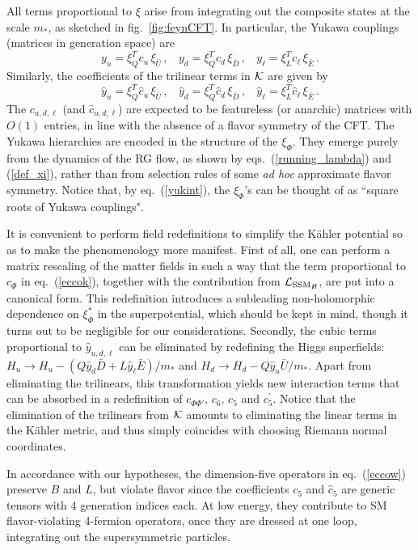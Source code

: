 \documentclass[a4paper,12pt]{article}
\newcommand{\beq}{\begin{equation}}
\newcommand{\eeq}{\end{equation}}
\def\eq#1{eq.~(\ref{#1})}
\def\fig#1{fig.~\ref{#1}}
\def\eq#1{eq.~(\ref{#1})}
\def\fig#1{fig.~\ref{#1}}
\def\mst{m_*}
\def\SSMnH{{\rm SSM}_{H \!\!\!\!\!\not\,\,\,\,\,}}
\begin{document}
All terms proportional to $\xi$ arise from integrating out the composite states at the scale $\mst$, as sketched in \fig{fig:feynCFT}. In particular, the Yukawa couplings (matrices in generation space) are
\beq
y_u =  \xi_{Q}^T c_u\, \xi_{{\bar U}}\, , ~~~~y_d = \xi_{Q}^T c_d \, \xi_{{\bar D}}\, , ~~~~y_\ell =  \xi_{L}^T c_\ell \, \xi_{{\bar E}}\, .
\label{yukint}
\eeq
Similarly, the coefficients of the trilinear terms in ${\cal K}$ are given by 
\beq
\hat y_u =  \xi_{Q}^T \hat c_u\, \xi_{{\bar U}}\, , ~~~~\hat y_d = \xi_{Q}^T \hat c_d \, \xi_{{\bar D}}\, , ~~~~\hat y_\ell =  \xi_{L}^T \hat c_\ell \, \xi_{{\bar E}}\, .
\eeq
 The $c_{u,d,\ell}$ (and $\hat c_{u,d,\ell}$) are expected to be featureless (or anarchic) matrices with $O(1)$ entries,  in line with the  absence of a flavor symmetry of  the CFT.  The Yukawa hierarchies are  encoded in the structure of the $\xi_\Phi$. They emerge purely from the dynamics of the RG flow, as shown by eqs.~(\ref{running_lambda}) and (\ref{def_xi}), rather than from selection rules of some {\emph{ad hoc}} approximate flavor symmetry. Notice that, by   \eq{yukint},  the $\xi_\Phi$'s can be thought of as ``square roots of Yukawa couplings".

It is convenient to perform field redefinitions to simplify the K\"ahler potential  so as to make the phenomenology more
manifest. First of all, one can perform a matrix rescaling of the matter fields in such a way that the term proportional to $c_\Phi$ in \eq{eccok}, together with the contribution from ${\cal L}_{\SSMnH}$, are put into a canonical form. This redefinition introduces a subleading non-holomorphic dependence on $\xi_\Phi^*$ in the superpotential, which should be kept in mind, though it turns out to be negligible for our considerations.
Secondly, the cubic terms proportional to $\hat y_{u,d,\ell}$ can be eliminated by redefining the Higgs superfields:
$H_u\to H_u-( Q \hat y_d \bar D+ L\hat y_\ell \bar E)/\mst$ and $H_d\to H_d- Q \hat y_u \bar U/\mst$. Apart from eliminating 
the trilinears, this transformation yields new interaction terms that can be absorbed in a redefinition of  $c_{\Phi\Phi'}$, $c_6$, $c_5$ and $c_5^\prime$. Notice that the elimination of the trilinears from ${\cal K}$ amounts to eliminating the linear terms in the K\"ahler metric,
and thus simply coincides with choosing Riemann normal coordinates.

In accordance with our hypotheses, the dimension-five operators in \eq{eccow} preserve $B$ and $L$, but violate flavor since the coefficients ${c}_5$ and ${\hat c}_5$ are generic tensors with 4 generation indices each. At low energy, they contribute to SM flavor-violating 4-fermion operators, once they are dressed at one loop, integrating out the supersymmetric particles.
\end{document}
